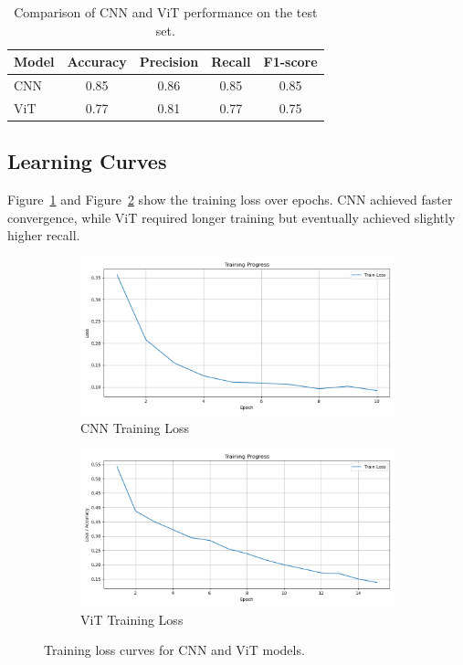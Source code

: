 \documentclass{article}
\begin{document}
\begin{table}[h!]
\centering
\begin{tabular}{lcccc}
\toprule
Model & Accuracy & Precision & Recall & F1-score \\
\midrule
CNN   & 0.85    & 0.86      & 0.85   & 0.85 \\
ViT   & 0.77    & 0.81      & 0.77   & 0.75 \\
\bottomrule
\end{tabular}
\caption{Comparison of CNN and ViT performance on the test set.}
\label{tab:results}
\end{table}

\subsection{Learning Curves}
Figure~\ref{fig:cnn_training_losses} and Figure~\ref{fig:vit_training_losses} show the training loss over epochs. CNN achieved faster convergence, while ViT required longer training but eventually achieved slightly higher recall.

\begin{figure}[h!]
    \centering
    \begin{subfigure}[b]{0.45\textwidth}
        \includegraphics[width=\textwidth]{cnn_training_loss.png}
        \caption{CNN Training Loss}
        \label{fig:cnn_training_losses}
    \end{subfigure}
    \hfill
    \begin{subfigure}[b]{0.45\textwidth}
        \includegraphics[width=\textwidth]{vit_training_loss.png}
        \caption{ViT Training Loss}
        \label{fig:vit_training_losses}
    \end{subfigure}
    \caption{Training loss curves for CNN and ViT models.}
    \label{fig:training_losses}
\end{figure}
\end{document}
